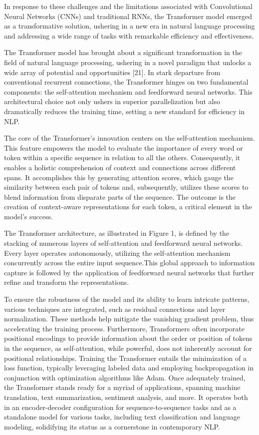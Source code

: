 \documentclass[conference]{IEEEtran}
\begin{document}
In response to these challenges and the limitations associated with Convolutional Neural Networks (CNNs) and traditional RNNs, the Transformer model emerged as a transformative solution, ushering in a new era in natural language processing and addressing a wide range of tasks with remarkable efficiency and effectiveness.

The Transformer model has brought about a significant transformation in the field of natural language processing, ushering in a novel paradigm that unlocks a wide array of potential and opportunities [21]. In stark departure from conventional recurrent connections, the Transformer hinges on two fundamental components: the self-attention mechanism and feedforward neural networks. This architectural choice not only ushers in superior parallelization but also dramatically reduces the training time, setting a new standard for efficiency in NLP.


The core of the Transformer's innovation centers on the self-attention mechanism. This feature empowers the model to evaluate the importance of every word or token within a specific sequence in relation to all the others. Consequently, it enables a holistic comprehension of context and connections across different spans. It accomplishes this by generating attention scores, which gauge the similarity between each pair of tokens and, subsequently, utilizes these scores to blend information from disparate parts of the sequence. The outcome is the creation of context-aware representations for each token, a critical element in the model's success.


The Transformer architecture, as illustrated in Figure 1, is defined by the stacking of numerous layers of self-attention and feedforward neural networks. Every layer operates autonomously, utilizing the self-attention mechanism concurrently across the entire input sequence.This global approach to information capture is followed by the application of feedforward neural networks that further refine and transform the representations.


To ensure the robustness of the model and its ability to learn intricate patterns, various techniques are integrated, such as residual connections and layer normalization. These methods help mitigate the vanishing gradient problem, thus accelerating the training process. Furthermore, Transformers often incorporate positional encodings to provide information about the order or position of tokens in the sequence, as self-attention, while powerful, does not inherently account for positional relationships.
Training the Transformer entails the minimization of a loss function, typically leveraging labeled data and employing backpropagation in conjunction with optimization algorithms like Adam. Once adequately trained, the Transformer stands ready for a myriad of applications, spanning machine translation, text summarization, sentiment analysis, and more. It operates both in an encoder-decoder configuration for sequence-to-sequence tasks and as a standalone model for various tasks, including text classification and language modeling, solidifying its status as a cornerstone in contemporary NLP.
\end{document}
